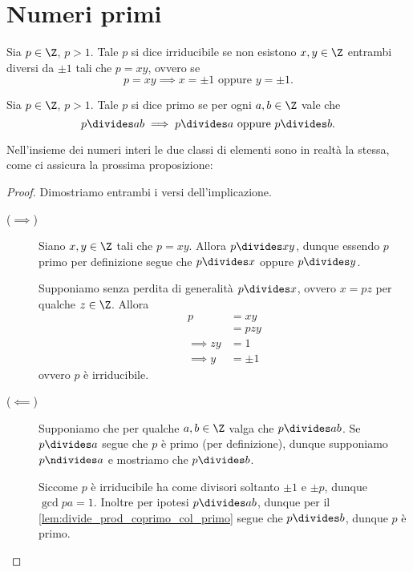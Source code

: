 \section{Numeri primi}

\begin{definition}
    [Irreducibile]
    Sia $p \in \Z$, $p > 1$. Tale $p$ si dice irriducibile se non esistono $x, y \in \Z$ entrambi diversi da $\pm 1$ tali che $p = xy$, ovvero se \begin{equation}
        p = xy \implies x = \pm 1 \text{ oppure } y = \pm 1.
    \end{equation}
\end{definition}

\begin{definition}
    [Primo]
    Sia $p \in \Z$, $p > 1$. Tale $p$ si dice primo se per ogni $a, b \in \Z$ vale che \begin{equation}
        p \divides ab \implies p \divides a \text{ oppure } p \divides b.
    \end{equation}
\end{definition}

Nell'insieme dei numeri interi le due classi di elementi sono in realtà la stessa, come ci assicura la prossima proposizione:
\begin{proof}
    Dimostriamo entrambi i versi dell'implicazione.
    \begin{description}
        \item[($\implies$)] Siano $x, y \in \Z$ tali che $p = xy$. Allora $p \divides xy$, dunque essendo $p$ primo per definizione segue che $p \divides x$ oppure $p \divides y$.
        
        Supponiamo senza perdita di generalità $p \divides x$, ovvero $x = pz$ per qualche $z \in \Z$. Allora \begin{align*}
            p &= xy \\
            &= pzy \\
            \implies zy &= 1 \\
            \implies y &= \pm 1
        \end{align*} ovvero $p$ è irriducibile.
        \item[($\impliedby$)] Supponiamo che per qualche $a, b \in \Z$ valga che $p \divides ab$. Se $p \divides a$ segue che $p$ è primo (per definizione), dunque supponiamo $p \ndivides a$ e mostriamo che $p \divides b$.
        
        Siccome $p$ è irriducibile ha come divisori soltanto $\pm 1$ e $\pm p$, dunque $\gcd{p}{a} = 1$. Inoltre per ipotesi $p \divides ab$, dunque per il \autoref{lem:divide_prod_coprimo_col_primo} segue che $p \divides b$, dunque $p$ è primo.
    \end{description}
\end{proof}

